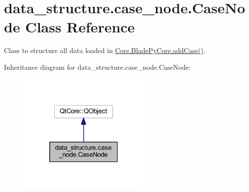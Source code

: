 \hypertarget{a00089}{}\section{data\+\_\+structure.\+case\+\_\+node.\+Case\+Node Class Reference}
\label{a00089}


Class to structure all data loaded in \hyperlink{a00081_a1a62f9b5b8f5929bdb6f0a8c27049d9e}{Core.\+Blade\+Py\+Core.\+add\+Case()}.  




Inheritance diagram for data\+\_\+structure.\+case\+\_\+node.\+Case\+Node\+:
\nopagebreak
\begin{figure}[H]
\begin{center}
\leavevmode
\includegraphics[width=183pt]{a00088}
\end{center}
\end{figure}
